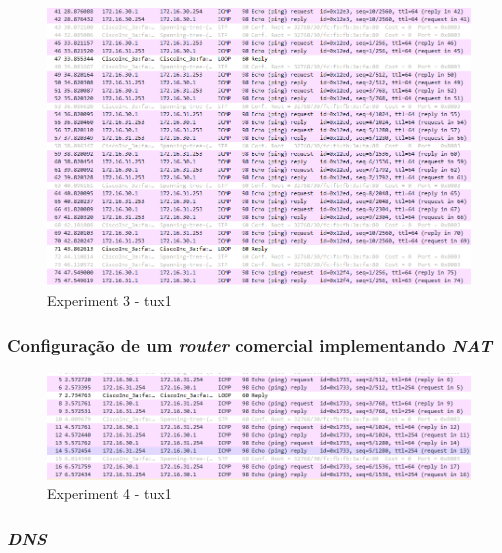 \documentclass[a4paper]{article}
\begin{document}
	\begin{figure}[H]
	\begin{center}
  	\includegraphics[width=\linewidth]{exp3_tux1.png}
  	\caption{Experiment 3 - tux1}
  	\label{fig:Experiment 3 - tux1}
	\end{center}
	\end{figure}

	\subsubsection{Configuração de um \textit{router} comercial implementando \textit{NAT}}

	\begin{figure}[H]
	\begin{center}
  	\includegraphics[width=\linewidth]{exp4_tux1.png}
  	\caption{Experiment 4 - tux1}
  	\label{fig:Experiment 4 - tux1}
	\end{center}
	\end{figure}

	\subsubsection{\textit{DNS}}
\end{document}
